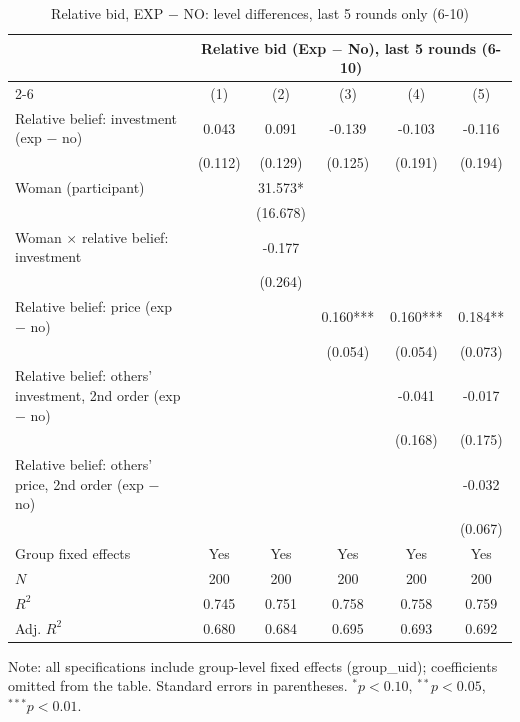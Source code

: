\begin{table}[!htbp]
  \centering
  \caption{Relative bid, EXP $-$ NO: level differences, last 5 rounds only (6-10)}
  \begin{tabular}{l*{5}{c}}
    \toprule
     & \multicolumn{5}{c}{Relative bid (Exp $-$ No), last 5 rounds (6-10)} \\
    \cmidrule(lr){2-6}
     & (1) & (2) & (3) & (4) & (5) \\
    \midrule
Relative belief: investment (exp $-$ no) & 0.043 & 0.091 & -0.139 & -0.103 & -0.116 \\
 & (0.112) & (0.129) & (0.125) & (0.191) & (0.194) \\
Woman (participant) &  & 31.573* &  &  &  \\
 &  & (16.678) &  &  &  \\
Woman $\times$ relative belief: investment &  & -0.177 &  &  &  \\
 &  & (0.264) &  &  &  \\
Relative belief: price (exp $-$ no) &  &  & 0.160*** & 0.160*** & 0.184** \\
 &  &  & (0.054) & (0.054) & (0.073) \\
Relative belief: others' investment, 2nd order (exp $-$ no) &  &  &  & -0.041 & -0.017 \\
 &  &  &  & (0.168) & (0.175) \\
Relative belief: others' price, 2nd order (exp $-$ no) &  &  &  &  & -0.032 \\
 &  &  &  &  & (0.067) \\
    \midrule
    Group fixed effects & Yes & Yes & Yes & Yes & Yes \\
    $N$ & 200 & 200 & 200 & 200 & 200 \\
    $R^2$ & 0.745 & 0.751 & 0.758 & 0.758 & 0.759 \\
    Adj. $R^2$ & 0.680 & 0.684 & 0.695 & 0.693 & 0.692 \\
    \bottomrule
  \end{tabular}
  \begin{tablenotes}
  \footnotesize
  \item Note: all specifications include group-level fixed effects (group\_uid); coefficients omitted from the table. Standard errors in parentheses. $^{*}p<0.10$, $^{**}p<0.05$, $^{***}p<0.01$.
  \end{tablenotes}
\end{table}
